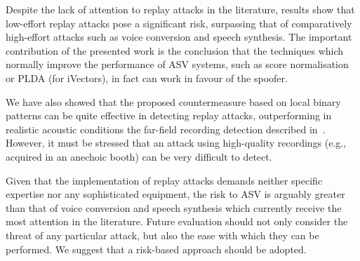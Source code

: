 Despite the lack of attention to replay attacks in the literature, results show that low-effort replay attacks pose a significant risk, surpassing that of comparatively high-effort attacks such as voice conversion and speech synthesis.
The important contribution of the presented work is the conclusion that the techniques which normally improve the performance of ASV systems, such as score normalisation or PLDA (for iVectors), in fact can work in favour of the spoofer.

We have also showed that the proposed countermeasure based on local binary patterns can be quite effective in detecting replay attacks, outperforming in realistic acoustic conditions the far-field recording detection described in~\cite{Villalba2011}. However, it must be stressed that an attack using high-quality recordings (e.g., acquired in an anechoic booth) can be very difficult to detect.
 

Given that the implementation of replay attacks demands neither specific expertise nor any sophisticated equipment, the risk to ASV is arguably greater than that of voice conversion and speech synthesis which currently receive the most attention in the literature. Future evaluation should not only consider the threat of any particular attack, but also the ease with which they can be performed. We suggest that a risk-based approach should be adopted.
